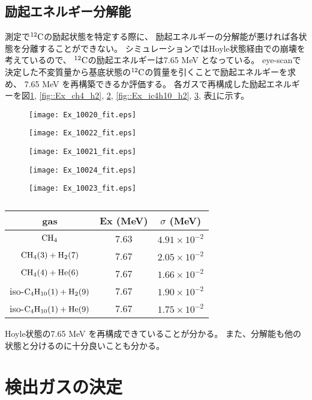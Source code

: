 \documentclass[../master]{subfiles}
\begin{document}
\subsection{励起エネルギー分解能}
測定で${}^{12}{\rm C}$の励起状態を特定する際に、
励起エネルギーの分解能が悪ければ各状態を分離することができない。
シミュレーションではHoyle状態経由での崩壊を考えているので、
${}^{12}{\rm C}$の励起エネルギーは7.65 MeV となっている。
eye-scanで決定した不変質量から基底状態の${}^{12}{\rm C}$の質量を引くことで励起エネルギーを求め、
7.65 MeV を再構築できるか評価する。
各ガスで再構成した励起エネルギーを図\ref{fig::Ex_ch4}, \ref{fig::Ex_ch4_h2}, \ref{fig::Ex_ch4_he},
\ref{fig::Ex_ic4h10_h2}, \ref{fig::Ex_ic4h10_he}, 表\ref{tab::Ex_resolution}に示す。
\begin{figure}
  \centering
  \begin{minipage}{0.45\columnwidth}
    \centering
    \texttt{[image: Ex\_10020\_fit.eps]}
    \caption{}
    \label{fig::Ex_ch4}
  \end{minipage}
\end{figure}
\begin{figure}
  \centering
  \begin{minipage}{0.45\columnwidth}
    \centering
    \texttt{[image: Ex\_10022\_fit.eps]}
    \caption{}
    \label{fig::Ex_ch4_h2}
  \end{minipage}
  \begin{minipage}{0.45\columnwidth}
    \centering
    \texttt{[image: Ex\_10021\_fit.eps]}
    \caption{}
    \label{fig::Ex_ch4_he}
  \end{minipage}
\end{figure}
\begin{figure}
  \centering
  \begin{minipage}{0.45\columnwidth}
    \centering
    \texttt{[image: Ex\_10024\_fit.eps]}
    \caption{}
    \label{fig::Ex_ic4h10_h2}
  \end{minipage}
  \begin{minipage}{0.45\columnwidth}
    \centering
    \texttt{[image: Ex\_10023\_fit.eps]}
    \caption{}
    \label{fig::Ex_ic4h10_he}
  \end{minipage}
\end{figure}
\begin{table}
  \centering
  \caption{}
  \label{tab::Ex_resolution}
  \begin{tabular}{ccc}
    \toprule
    gas & Ex (MeV) & $\sigma$ (MeV) \\
    \midrule
    $\rm CH_{4}$ & 7.63 & $4.91\times 10^{-2}$ \\
    $\rm CH_{4} (3) + H_{2} (7)$ & 7.67 & $2.05\times 10^{-2}$ \\
    $\rm CH_{4} (4) + He (6)$ & 7.67 & $1.66\times 10^{-2}$ \\
    iso-$\rm C_{4}H_{10} (1) + H_{2} (9)$ & 7.67 & $1.90\times 10^{-2}$ \\
    iso-$\rm C_{4}H_{10} (1) + He (9)$ & 7.67 & $1.75\times 10^{-2}$ \\
    \bottomrule
  \end{tabular}
\end{table}
Hoyle状態の7.65 MeV を再構成できていることが分かる。
また、分解能も他の状態と分けるのに十分良いことも分かる。

\section{検出ガスの決定}
\end{document}
